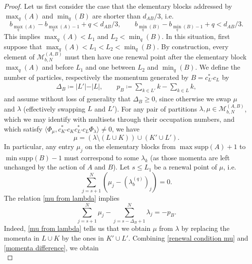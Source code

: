\documentclass[letterpaper, DIV=17]{scrartcl}
\numberwithin{equation}{section}
\theoremstyle{definition}
\begin{document}
\begin{proof}

	Let us first consider the case that the elementary blocks addressed by $ \max_q(A) $ and $ \min_q(B) $ are shorter than $ d_{AB}/3 $, i.e.
	$$
		b_{\max_q(A)}-b_{\max_q(A)-1}+q< d_{AB}/3, \qquad b_{\min_q(B)}-b_{\min_q(B)-1}+q< d_{AB}/3.
	$$
	This implies $\max_q(A)<L_1$ and $L_2<\min_q(B)$. In this situation, first suppose that
	 $\max_q(A)<L_1<L_2<\min_q(B)$. By construction, every element of $\mathcal{M}_{b,N}^{(A,B)}$ must then have one renewal point after the elementary block $\max_q(A) $ and before $L_1$ and one between $L_2 $ and $ \min_q(B)$. 
	 We define the number of particles, respectively the momentum generated by $ B = c_{L'}^* c_L $ by
	\begin{align*}
		\Delta_B \coloneqq \vert L'\vert - \vert L \vert, \qquad p_B \coloneqq \sum_{k\in L'} k - \sum_{k\in L} k, 
	\end{align*}
	and assume without loss of generality  that $\Delta_B\geq 0$, since otherwise we swap $\mu$ and $\lambda$ (effectively swapping $L$ and $L'$). 
	For any  pair of partitions $\lambda, \mu \in \mathcal{M}_{b,N}^{(A,B)}$, which we may identify with multisets through their occupation numbers, and which satisfy
	$
		\langle \Phi_\mu, c_{K'}^* c_K c_{L'}^* c_L \Phi_\lambda \rangle \neq 0 $, 
	we have 
	\begin{equation} \label{mu from lambda}
		\mu = (\lambda\setminus (L\cup K)) \cup (K'\cup L') . 
	\end{equation} 
	In particular, any entry $\mu_j $ on the elementary blocks from $ \max \mathrm{supp}(A)+1 $ to $ \min \mathrm{supp}(B)-1$ must correspond to some $\lambda_k$ (as those momenta are left unchanged by the action of $A$ and $B$). Let $s\leq L_1$ be a renewal point of $\mu$, i.e.
	\begin{equation} \label{renewal condition mu}
		\sum_{j=s+1}^N (\mu_j - (\lambda_b^{(q)})_j) = 0.
	\end{equation}   
	The relation \eqref{mu from lambda} implies
	\begin{equation} \label{momenta difference}
		\sum_{j=s+1}^N \mu_j - \sum_{j=s-\Delta_B+1}^N \lambda_j = -p_B.
	\end{equation}
	Indeed, \eqref{mu from lambda} tells us that we obtain $\mu$ from $\lambda$ by replacing the momenta in $L\cup K$ by the ones in $K'\cup L'$. Combining \eqref{renewal condition mu} and \eqref{momenta difference}, we obtain
	\begin{equation} \label{renewal equation mu}

\end{equation}
\end{proof}
\end{document}
